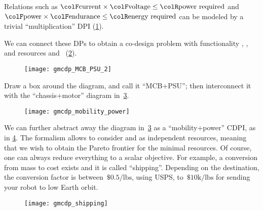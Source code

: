 \begin{example}

  Relations such as ${\colF\mbox{current}}\times{\colF\mbox{voltage}}\leq{\colR\mbox{power required}}$
  and ${\colF\mbox{power}}\times{\colF\mbox{endurance}}\leq{\colR\mbox{energy required}}$
  can be modeled by a trivial ``multiplication'' DPI (\cref{fig:current_times_voltage}).

  \begin{figure}[h]
    \centering
    \caption{\label{fig:current_times_voltage}}
  \end{figure}


  We can connect these DPs to obtain a co-design problem with
  functionality , ,  and resources
   and ~(\cref{fig:connect}).

  \begin{figure}[h]
    \centering
    \texttt{[image: gmcdp\_MCB\_PSU\_2]}
    \caption{\label{fig:connect}}
  \end{figure}


  Draw a box around the diagram, and call it ``MCB+PSU'';
  then interconnect it with the ``chassis+motor'' diagram in~\cref{fig:another}.


  \begin{figure}[h]
    \begin{centering}
      \texttt{[image: gmcdp\_mobility\_power]}
    \end{centering}
    \caption{\label{fig:another}}
  \end{figure}

  We can further abstract away the diagram in~\cref{fig:another} as
  a ``mobility+power'' CDPI, as in \cref{fig:shipping}. The formalism
  allows to consider  and  as independent resources,
  meaning that we wish to obtain the Pareto frontier for the minimal
  resources. Of course, one can always reduce everything to a scalar
  objective. For example, a conversion from mass to cost exists and
  it is called ``shipping''. Depending on the destination, the conversion
  factor is between~$\$0.5/\mbox{lbs}$, using USPS, to~$\$10\mbox{k}/\mbox{lbs}$
  for sending your robot to low Earth orbit.


  \begin{figure}[h]
    \centering{}\texttt{[image: gmcdp\_shipping]}\caption{\label{fig:shipping}}
  \end{figure}

\end{example}

